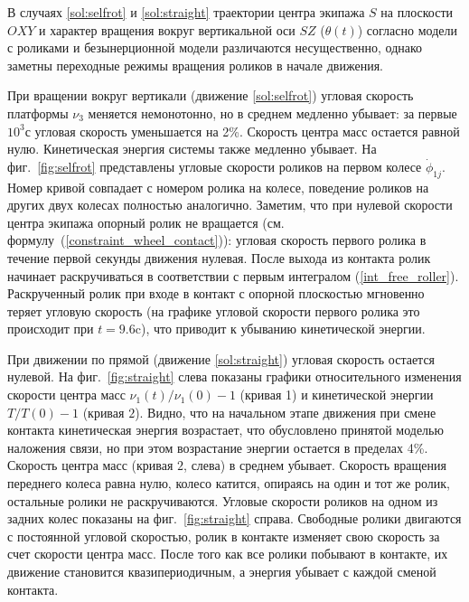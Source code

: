 В случаях \ref{sol:selfrot} и \ref{sol:straight} траектории центра экипажа $S$ на плоскости $OXY$ и характер вращения вокруг вертикальной оси $SZ$ ($\theta(t)$) согласно модели с роликами и безынерционной модели различаются несущественно, однако заметны переходные режимы вращения роликов в начале движения.

При вращении вокруг вертикали (движение \ref{sol:selfrot}) угловая скорость платформы $\nu_3$ меняется немонотонно, но в среднем медленно убывает: за первые $10^3$с угловая скорость уменьшается на 2\%. Скорость центра масс остается равной нулю. Кинетическая энергия системы также медленно убывает. На 
фиг.~\ref{fig:selfrot} представлены угловые скорости роликов на первом колесе $\dot{\phi}_{1j}$. Номер кривой совпадает с номером ролика на колесе, поведение роликов на других двух колесах полностью аналогично. Заметим, что при нулевой скорости центра экипажа опорный ролик не вращается (см. формулу~(\ref{constraint_wheel_contact})): угловая скорость первого ролика в течение первой секунды движения нулевая. После выхода из контакта ролик начинает раскручиваться в соответствии с первым интегралом (\ref{int_free_roller}). Раскрученный ролик при входе в контакт с опорной плоскостью мгновенно теряет угловую скорость (на графике угловой скорости первого ролика это происходит при $t=9.6$c), что приводит к убыванию кинетической энергии.

При движении по прямой (движение \ref{sol:straight}) угловая скорость остается нулевой.
На фиг.~\ref{fig:straight} слева показаны графики относительного изменения скорости центра масс $\nu_1(t)/\nu_1(0) - 1$ (кривая 1) и кинетической энергии $T/T(0)-1$ (кривая $2$). Видно, что на начальном этапе движения при смене контакта кинетическая энергия возрастает, что обусловлено принятой моделью наложения связи, но при этом возрастание энергии остается в пределах 4\%. Скорость центра масс (кривая $2$, слева) в среднем убывает. Скорость вращения переднего колеса равна нулю, колесо катится, опираясь на один и тот же ролик, остальные ролики не раскручиваются. Угловые скорости роликов на одном из задних колес показаны на фиг.~\ref{fig:straight} справа. Свободные ролики двигаются с постоянной угловой скоростью, ролик в контакте изменяет свою скорость за счет скорости центра масс. После того как все ролики побывают в контакте, их движение становится квазипериодичным, а энергия убывает с каждой сменой контакта. 

